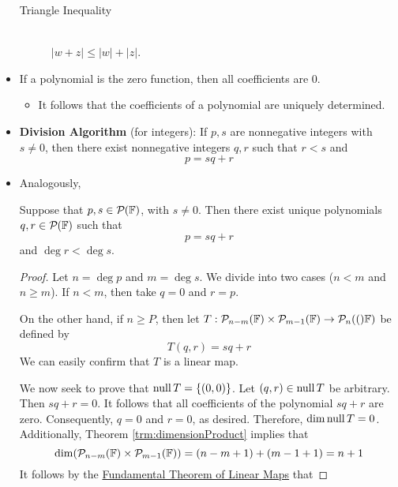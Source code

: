 \documentclass[../main.tex]{subfiles}
\begin{document}
\begin{itemize}
\begin{theorem}
\begin{description}
            \item[Triangle Inequality]\hfill\\ $|w+z|\leq|w|+|z|$.
        \end{description}
    \end{theorem}
    \item If a polynomial is the zero function, then all coefficients are 0.
    \begin{itemize}
        \item It follows that the coefficients of a polynomial are uniquely determined.
    \end{itemize}
    \item \textbf{Division Algorithm} (for integers): If $p,s$ are nonnegative integers with $s\neq 0$, then there exist nonnegative integers $q,r$ such that $r<s$ and
    \begin{equation*}
        p = sq+r
    \end{equation*}
    \item Analogously,
    \begin{theorem}
        Suppose that $p,s\in\pol{\F}$, with $s\neq 0$. Then there exist unique polynomials $q,r\in\pol{\F}$ such that
        \begin{equation*}
            p = sq+r
        \end{equation*}
        and $\deg r<\deg s$.
        \begin{proof}
            Let $n=\deg p$ and $m=\deg s$. We divide into two cases ($n<m$ and $n\geq m$). If $n<m$, then take $q=0$ and $r=p$.\par\smallskip
            On the other hand, if $n\geq P$, then let $T:\pol[n-m]{\F}\times\pol[m-1]{\F}\to\pol[n](\F)$ be defined by
            \begin{equation*}
                T(q,r) = sq+r
            \end{equation*}
            We can easily confirm that $T$ is a linear map.\par
            We now seek to prove that $\nul T=\{(0,0)\}$. Let $(q,r)\in\nul T$ be arbitrary. Then $sq+r=0$. It follows that all coefficients of the polynomial $sq+r$ are zero. Consequently, $q=0$ and $r=0$, as desired. Therefore, $\dim\nul T=0$. Additionally, Theorem \ref{trm:dimensionProduct} implies that
            \begin{equation*}
                \dim(\pol[n-m]{\F}\times\pol[m-1]{\F}) = (n-m+1)+(m-1+1) = n+1
            \end{equation*}
            It follows by the \hyperref[trm:fundamentalTheoremLinearMaps]{Fundamental Theorem of Linear Maps} that

\end{proof}
\end{theorem}
\end{itemize}
\end{document}
